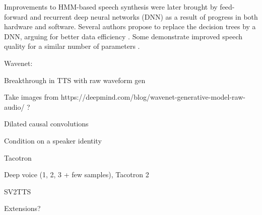 \documentclass[a4paper, oneside]{article}
\begin{document}
Improvements to HMM-based speech synthesis were later brought by feed-forward and recurrent deep neural networks (DNN) as a result of progress in both hardware and software. Several authors propose to replace the decision trees by a DNN, arguing for better data efficiency \cite{SPSSDNN, Lu_combininga, 6854318, Yin2014ModelingDP}. Some demonstrate improved speech quality for a similar number of parameters \cite{SPSSDNN, 6854318, Yin2014ModelingDP}.

\color{red}




Wavenet:

Breakthrough in TTS with raw waveform gen

Take images from https://deepmind.com/blog/wavenet-generative-model-raw-audio/ ?

Dilated causal convolutions

Condition on a speaker identity

Tacotron

Deep voice (1, 2, 3 + few samples), Tacotron 2

SV2TTS

Extensions?
\color{black}



\color{red}
\color{black}

\clearpage

 


























\end{document}
